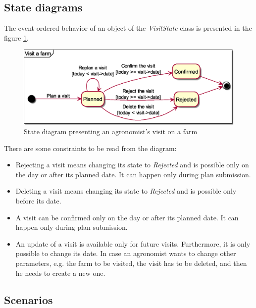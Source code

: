\subsection{State diagrams}

The event-ordered behavior of an object of the \textit{VisitState} class is presented in the figure \ref{fig:state_diagram}.

\begin{figure}[H]
    \centering
    \includegraphics[width=\textwidth, keepaspectratio, origin=c]{diagrams/state}
    \caption{State diagram presenting an agronomist's visit on a farm}
    \label{fig:state_diagram}
\end{figure}

There are some constraints to be read from the diagram:

\begin{itemize}
    \item Rejecting a visit means changing its state to \textit{Rejected} and is possible only on the day or after its planned date. It can happen only during plan submission.
    \item Deleting a visit means changing its state to \textit{Rejected} and is possible only before its date.
    \item A visit can be confirmed only on the day or after its planned date. It can happen only during plan submission.
    \item An update of a visit is available only for future visits. Furthermore, it is only possible to change its date. In case an agronomist wants to change other parameters, e.g. the farm to be visited, the visit has to be deleted, and then he needs to create a new one.
\end{itemize}


\subsection{Scenarios}
